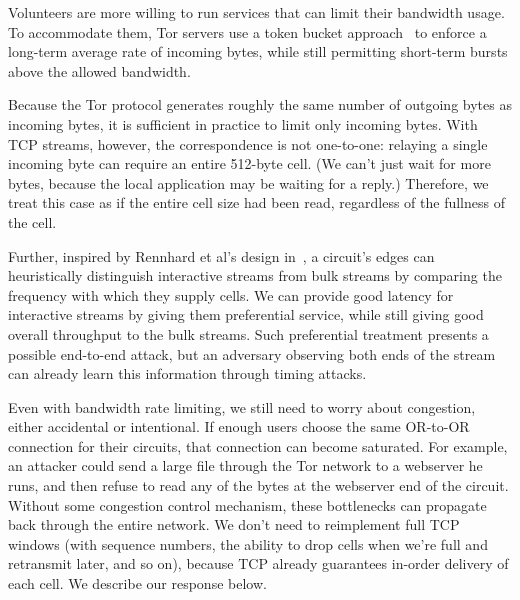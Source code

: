 \documentclass[times,10pt,twocolumn]{article}
\begin{document}
\label{subsec:rate-limit}

Volunteers are more willing to run services that can limit
their bandwidth usage. To accommodate them, Tor servers use a
token bucket approach~\cite{tannenbaum96} to
enforce a long-term average rate of incoming bytes, while still
permitting short-term bursts above the allowed bandwidth.


Because the Tor protocol generates roughly the same number of outgoing
bytes as incoming bytes, it is sufficient in practice to limit only
incoming bytes.
With TCP streams, however, the correspondence is not one-to-one:
relaying a single incoming byte can require an entire 512-byte cell.
(We can't just wait for more bytes, because the local application may
be waiting for a reply.) Therefore, we treat this case as if the entire
cell size had been read, regardless of the fullness of the cell.

Further, inspired by Rennhard et al's design in~\cite{anonnet}, a
circuit's edges can heuristically distinguish interactive streams from bulk
streams by comparing the frequency with which they supply cells.  We can
provide good latency for interactive streams by giving them preferential
service, while still giving good overall throughput to the bulk
streams. Such preferential treatment presents a possible end-to-end
attack, but an adversary observing both
ends of the stream can already learn this information through timing
attacks.

\label{subsec:congestion}

Even with bandwidth rate limiting, we still need to worry about
congestion, either accidental or intentional. If enough users choose the
same OR-to-OR connection for their circuits, that connection can become
saturated. For example, an attacker could send a large file
through the Tor network to a webserver he runs, and then
refuse to read any of the bytes at the webserver end of the
circuit. Without some congestion control mechanism, these bottlenecks
can propagate back through the entire network. We don't need to
reimplement full TCP windows (with sequence numbers,
the ability to drop cells when we're full and retransmit later, and so
on),
because TCP already guarantees in-order delivery of each
cell.
We describe our response below.
\end{document}
